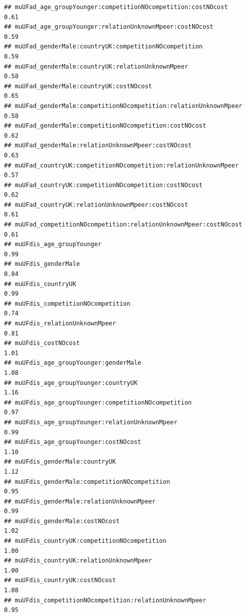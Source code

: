 \documentclass[
]{article}
\begin{document}
\begin{verbatim}
## muUFad_age_groupYounger:competitionNOcompetition:costNOcost                 0.61
## muUFad_age_groupYounger:relationUnknownMpeer:costNOcost                     0.59
## muUFad_genderMale:countryUK:competitionNOcompetition                        0.59
## muUFad_genderMale:countryUK:relationUnknownMpeer                            0.58
## muUFad_genderMale:countryUK:costNOcost                                      0.65
## muUFad_genderMale:competitionNOcompetition:relationUnknownMpeer             0.58
## muUFad_genderMale:competitionNOcompetition:costNOcost                       0.62
## muUFad_genderMale:relationUnknownMpeer:costNOcost                           0.63
## muUFad_countryUK:competitionNOcompetition:relationUnknownMpeer              0.57
## muUFad_countryUK:competitionNOcompetition:costNOcost                        0.62
## muUFad_countryUK:relationUnknownMpeer:costNOcost                            0.61
## muUFad_competitionNOcompetition:relationUnknownMpeer:costNOcost             0.61
## muUFdis_age_groupYounger                                                    0.99
## muUFdis_genderMale                                                          0.84
## muUFdis_countryUK                                                           0.99
## muUFdis_competitionNOcompetition                                            0.74
## muUFdis_relationUnknownMpeer                                                0.81
## muUFdis_costNOcost                                                          1.01
## muUFdis_age_groupYounger:genderMale                                         1.08
## muUFdis_age_groupYounger:countryUK                                          1.16
## muUFdis_age_groupYounger:competitionNOcompetition                           0.97
## muUFdis_age_groupYounger:relationUnknownMpeer                               0.99
## muUFdis_age_groupYounger:costNOcost                                         1.10
## muUFdis_genderMale:countryUK                                                1.12
## muUFdis_genderMale:competitionNOcompetition                                 0.95
## muUFdis_genderMale:relationUnknownMpeer                                     0.99
## muUFdis_genderMale:costNOcost                                               1.02
## muUFdis_countryUK:competitionNOcompetition                                  1.00
## muUFdis_countryUK:relationUnknownMpeer                                      1.00
## muUFdis_countryUK:costNOcost                                                1.08
## muUFdis_competitionNOcompetition:relationUnknownMpeer                       0.95

\end{verbatim}
\end{document}
